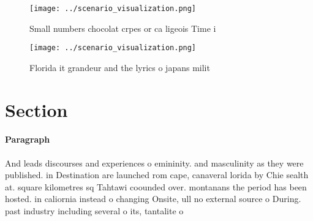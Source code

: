 \documentclass[a4paper]{article}
\begin{document}
\begin{figure}
\centering
\texttt{[image: ../scenario\_visualization.png]}
\caption{Small numbers chocolat crpes or ca ligeois Time i
}
\end{figure}
 
\begin{figure}
\centering
\texttt{[image: ../scenario\_visualization.png]}
\caption{Florida it grandeur and the lyrics o japans milit
}
\end{figure}
 
\section{Section}

\paragraph{Paragraph}
And leads discourses and experiences o emininity. and masculinity as they were published. in Destination are launched rom cape, canaveral lorida by Chie sealth at. square kilometres sq Tahtawi coounded over. montanans the period has been hosted. in caliornia instead o changing Onsite, ull no external source o During. past industry including several o its, tantalite o
\end{document}

